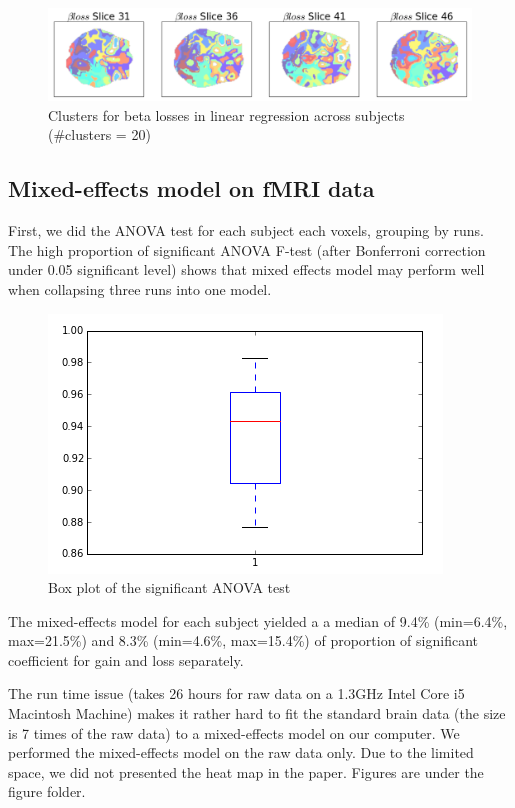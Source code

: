 \documentclass[11pt]{article}
\begin{document}
\begin{figure}[H]
    \centering
      \includegraphics[scale=0.4]{figures/Regression2/beta_loss_cluster.png}
    \caption{Clusters for beta losses in linear regression across subjects 
    (\#clusters = 20)}
\end{figure}


\subsection{Mixed-effects model on fMRI data}
First, we did the ANOVA test for each subject each voxels, grouping by runs. 
The high proportion of significant ANOVA F-test (after Bonferroni correction 
under 0.05 significant level) shows that mixed effects model may perform well 
when collapsing three runs into one model. 
\begin{figure}[H]
    \centering
        \includegraphics[scale=0.45]{figures/anova_prop.png}
\caption{Box plot of the significant ANOVA test}
\end{figure}
The mixed-effects model for each subject yielded a a median of 9.4\% (min=6.4\%, 
max=21.5\%) and 8.3\% (min=4.6\%, max=15.4\%) of proportion of significant 
coefficient for gain and loss separately. 

The run time issue (takes 26 hours for raw data on a 1.3GHz Intel Core i5 
Macintosh Machine) makes it rather hard to fit the standard brain data (the 
size is 7 times of the raw data) to a mixed-effects model on our computer. 
We performed the mixed-effects model on the raw data only. Due to the limited 
space, we did not presented the heat map in the paper. Figures are under the 
figure folder.
\end{document}
